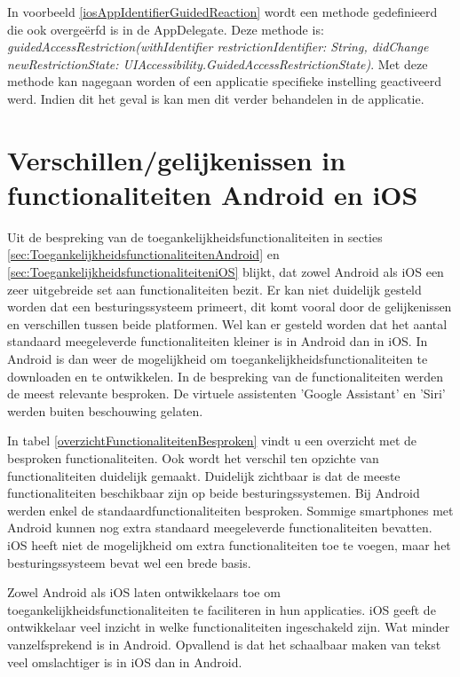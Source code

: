 In voorbeeld \ref{iosAppIdentifierGuidedReaction} wordt een methode gedefinieerd die ook overgeërfd is in de AppDelegate. Deze methode is: \emph{guidedAccessRestriction(withIdentifier restrictionIdentifier: String, didChange newRestrictionState: UIAccessibility.GuidedAccessRestrictionState)}. Met deze methode kan nagegaan worden of een applicatie specifieke instelling geactiveerd werd. Indien dit het geval is kan men dit verder behandelen in de applicatie.
\newpage

\section{Verschillen/gelijkenissen in functionaliteiten Android en iOS}
Uit de bespreking van de toegankelijkheidsfunctionaliteiten in secties \ref{sec:ToegankelijkheidsfunctionaliteitenAndroid} en \ref{sec:ToegankelijkheidsfunctionaliteiteniOS} blijkt,  dat zowel Android als iOS een zeer uitgebreide set aan functionaliteiten bezit. Er kan niet duidelijk gesteld worden dat een besturingssysteem primeert, dit komt vooral door de gelijkenissen en verschillen tussen beide platformen. Wel kan er gesteld worden dat het aantal standaard meegeleverde functionaliteiten kleiner is in Android dan in iOS. In Android is dan weer de mogelijkheid om toegankelijkheidsfunctionaliteiten te downloaden en te ontwikkelen. In de bespreking van de functionaliteiten werden de meest relevante besproken. De virtuele assistenten 'Google Assistant' en 'Siri' werden buiten beschouwing gelaten.


In tabel \ref{overzichtFunctionaliteitenBesproken} vindt u een overzicht met de besproken functionaliteiten. Ook wordt het verschil ten opzichte van functionaliteiten duidelijk gemaakt. Duidelijk zichtbaar is dat de meeste functionaliteiten beschikbaar zijn op beide besturingssystemen. Bij Android werden enkel de standaardfunctionaliteiten besproken. Sommige smartphones met Android kunnen nog extra standaard meegeleverde functionaliteiten bevatten. iOS heeft niet de mogelijkheid om extra functionaliteiten toe te voegen, maar het besturingssysteem bevat wel een brede basis. 

Zowel Android als iOS laten ontwikkelaars toe om toegankelijkheidsfunctionaliteiten te faciliteren in hun applicaties. iOS geeft de ontwikkelaar veel inzicht in welke functionaliteiten ingeschakeld zijn. Wat minder vanzelfsprekend is in Android. Opvallend is dat het schaalbaar maken van tekst veel omslachtiger is in iOS dan in Android. 

